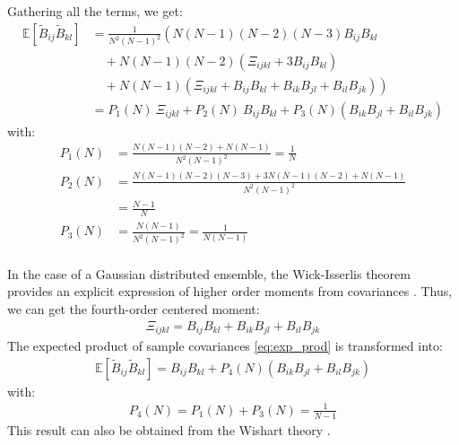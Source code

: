 \documentclass[12pt]{scrartcl}
\begin{document}
Gathering all the terms, we get:
\begin{align}
\label{eq:exp_prod}
\mathbb{E} \left[\widetilde{B}_{ij} \widetilde{B}_{kl}\right] & = \frac{1}{N^2(N-1)^2} \left(N(N-1)(N-2)(N-3) B_{ij} B_{kl} \right. \nonumber \\
& \quad + N(N-1)(N-2) \left(\Xi_{ijkl} + 3 B_{ij} B_{kl}\right) \nonumber \\
& \left. \quad + N(N-1) \left(\Xi_{ijkl} + B_{ij} B_{kl} + B_{ik} B_{jl} + B_{il} B_{jk}\right) \right)\nonumber \\
& = P_1(N) \ \Xi_{ijkl} + P_2(N) \ B_{ij} B_{kl} + P_3(N) \left(B_{ik} B_{jl} + B_{il} B_{jk}\right)
\end{align}
with:
\begin{subequations}
\begin{align}
P_1(N) & = \frac{N(N-1)(N-2) + N(N-1)}{N^2(N-1)^2} = \frac{1}{N} \\
P_2(N) & = \frac{N(N-1)(N-2)(N-3) + 3 N(N-1)(N-2) + N(N-1)}{N^2(N-1)^2}  \nonumber \\
& = \frac{N-1}{N}\\
P_3(N) & = \frac{N(N-1)}{N^2(N-1)^2} = \frac{1}{N(N-1)}
\end{align}
\end{subequations}
$  $\\
In the case of a Gaussian distributed ensemble, the Wick-Isserlis theorem provides an explicit expression of higher order moments from covariances \citep{isserlis_1916,isserlis_1918}. Thus, we can get the fourth-order centered moment:
\begin{align}
\label{eq:wick_isserlis}
\Xi_{ijkl} = B_{ij}B_{kl} + B_{ik}B_{jl} + B_{il}B_{jk}
\end{align}
The expected product of sample covariances \eqref{eq:exp_prod} is transformed into:
\begin{align}
\label{eq:exp_prod_gau}
\mathbb{E} \left[\widetilde{B}_{ij} \widetilde{B}_{kl}\right] = B_{ij} B_{kl} + P_4(N) \left(B_{ik} B_{jl} + B_{il} B_{jk}\right)
\end{align}
with:
\begin{align}
P_4(N) = P_1(N) + P_3(N) = \frac{1}{N-1}
\end{align}
This result can also be obtained from the Wishart theory \citep{wishart_1928,muirhead_2005}.
\end{document}
